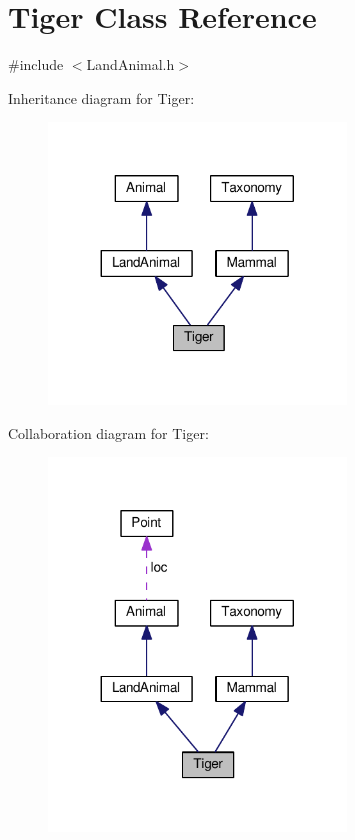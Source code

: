 \hypertarget{classTiger}{}\section{Tiger Class Reference}
\label{classTiger}


{\ttfamily \#include $<$Land\+Animal.\+h$>$}



Inheritance diagram for Tiger\+:
\nopagebreak
\begin{figure}[H]
\begin{center}
\leavevmode
\includegraphics[width=224pt]{classTiger__inherit__graph}
\end{center}
\end{figure}


Collaboration diagram for Tiger\+:
\nopagebreak
\begin{figure}[H]
\begin{center}
\leavevmode
\includegraphics[width=224pt]{classTiger__coll__graph}
\end{center}
\end{figure}
